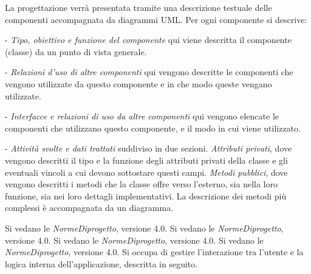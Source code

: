 La progettazione verr\`a presentata tramite una descrizione testuale delle componenti accompagnata da diagrammi UML. Per ogni componente si descrive:
\begin{elencopuntato}[\subsecindent]
\item[-] \textit{Tipo, obiettivo e funzione del componente} qui viene descritta il componente (classe) da un punto di vista generale.
\item[-] \textit{Relazioni d'uso di altre componenti} qui vengono descritte le componenti che vengono utilizzate da questo componente e in che modo queste vengano utilizzate.
\item[-] \textit{Interfacce e relazioni di uso da altre componenti} qui vengono elencate le componenti che utilizzano questo componente, e il modo in cui viene utilizzato.
\item[-] \textit{Attivit\`a svolte e dati trattati} suddiviso in due sezioni. \textit{Attributi privati}, dove vengono descritti il tipo e la funzione degli attributi privati della classe e gli eventuali vincoli a cui devono sottostare questi campi. \textit{Metodi pubblici}, dove vengono descritti i metodi che la classe offre verso l'esterno, sia nella loro funzione, sia nei loro dettagli implementativi. La descrizione dei metodi pi\`u complessi \`e accompagnata da un diagramma.
\end{elencopuntato}

Si vedano le \textit{NormeDiprogetto}, versione 4.0.
Si vedano le \textit{NormeDiprogetto}, versione 4.0.
Si vedano le \textit{NormeDiprogetto}, versione 4.0.
Si vedano le \textit{NormeDiprogetto}, versione 4.0.
\newpage
{}
Si occupa di gestire l'interazione tra l'utente e la logica interna dell'applicazione, descritta in seguito.


